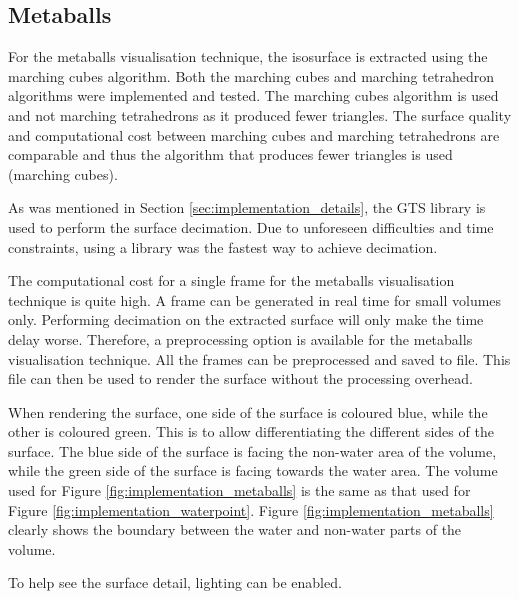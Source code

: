 
\subsection{Metaballs}
\label{sub:implementation_metaballs}

For the metaballs visualisation technique, the isosurface is extracted using
the marching cubes algorithm. Both the marching cubes and marching tetrahedron
algorithms were implemented and tested. The marching cubes algorithm is used
and not marching tetrahedrons as it produced fewer triangles. The surface
quality and computational cost between marching cubes and marching tetrahedrons
are comparable and thus the algorithm that produces fewer triangles is used
(marching cubes).

As was mentioned in Section \ref{sec:implementation_details}, the GTS library
is used to perform the surface decimation. Due to unforeseen difficulties and
time constraints, using a library was the fastest way to achieve decimation.

The computational cost for a single frame for the metaballs visualisation
technique is quite high. A frame can be generated in real time for small
volumes only. Performing decimation on the extracted surface will only make the
time delay worse. Therefore, a preprocessing option is available for the
metaballs visualisation technique. All the frames can be preprocessed and saved
to file. This file can then be used to render the surface without the
processing overhead.

When rendering the surface, one side of the surface is coloured blue, while the
other is coloured green. This is to allow differentiating the different sides
of the surface. The blue side of the surface is facing the non-water area of
the volume, while the green side of the surface is facing towards the water
area. The volume used for Figure \ref{fig:implementation_metaballs} is the same
as that used for Figure \ref{fig:implementation_waterpoint}. Figure
\ref{fig:implementation_metaballs} clearly shows the boundary between the water
and non-water parts of the volume.

To help see the surface detail, lighting can be enabled.

